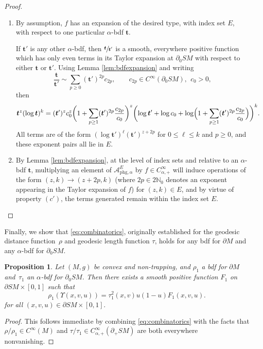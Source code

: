\documentclass[11pt]{article}
\newcommand{\skpt}{\smallskip}
\newenvironment{enumeratea}
{\bgroup\def\theenumi{\alph{enumi}}\begin{enumerate}}
{\end{enumerate}\egroup}
\theoremstyle{plain}
\newtheorem{Proposition}[Theorem]{Proposition}
\theoremstyle{definition}
\theoremstyle{remark}
\def\Nm{{\mathbb{N}}}
\def\A{\mathcal{A}}
\newcommand{\bt}{{\boldsymbol{t}}}
\newcommand{\del}{\partial}
\newcommand{\phg}{\mathrm{phg}}
\begin{document}
\skpt
\begin{proof}
\begin{enumeratea}
\item
By assumption, $f$ has an expansion of the desired type, with index set $E$, with respect to one particular $\alpha$-bdf $\bt$.

If $\bt'$ is any other $\alpha$-bdf, then $\sfrac{\bt}{\bt'}$ is a smooth, everywhere positive function which has only even terms in its Taylor expansion at $\del_0 SM$ with respect to either $\bt$ or $\bt'$. Using Lemma \ref{lem:bdfexpansion} and writing\vspace*{-3pt}\enlargethispage{.5\baselineskip}
\begin{equation*}
\frac{\bt}{\bt'} \sim \sum_{p\ge 0} (\bt')^{2p} c_{2p}, \qquad c_{2p}\in C^\infty(\partial_0 SM), \ \ c_0 > 0,
\end{equation*}
then\vspace*{-5pt}
\begin{equation*}
\bt^z (\log \bt)^k = (\bt')^z c^z_0 \biggl(1 + \sum_{p\ge 1} (\bt')^{2p} \frac{c_{2p}}{c_0} \biggr)^z \biggl(\log \bt' + \log c_0 + \log \Bigl(1 + \sum_{p\ge 1} (\bt')^{2p} \frac{c_{2p}}{c_0} \Bigr)\biggr)^k.
\end{equation*}
All terms are of the form $(\log \bt')^{\ell} (\bt')^{z+2p}$ for $0\le \ell \le k$ and $p\ge 0$, and these exponent pairs all lie in $E$.

\item
By Lemma \ref{lem:bdfexpansion}, at the level of index sets and relative to an $\alpha$-bdf $\bt$, multiplying an element of $\A_{\phg,\alpha}^E$ by $f\in C_{\alpha,+}^\infty$ will induce operations of the form $(z,k)\to (z+2p,k)$ (where $2p\in 2\Nm_0$ denotes an exponent appearing in the Taylor expansion of $f$) for $(z,k)\in E$, and by virtue of property $(c')$, the terms generated remain within the index set $E$.\qedhere
\end{enumeratea}
\end{proof}

Finally, we show that \eqref{eq:combinatorics}, originally established for the geodesic distance function~$\rho$
and geodesic length function $\tau$, holds for any bdf for $\del M$ and any $\alpha$-bdf for $\partial_0 SM$.

\begin{Proposition}\label{prop:combinatorics2}
Let $(M,g)$ be convex and non-trapping, and $\rho_1$ a bdf for $\partial M$ and~$\tau_1$ an $\alpha$-bdf for $\partial_0 SM$.
Then there exists a smooth positive function $F_1$ on $\del SM\times [0,1]$ such that
\begin{equation*}
\rho_1 (\Upsilon(x,v,u)) = \tau_1^2 (x,v) u(1-u) F_1(x,v,u).
\end{equation*}
for all $(x,v,u)\in \partial SM\times [0,1]$.
\end{Proposition}
\begin{proof}
This follows immediate by combining \eqref{eq:combinatorics} with the facts that $\rho/\rho_1 \in C^\infty(M)$
and $\tau/\tau_1\in C_{\alpha,+}^\infty(\partial_+ SM)$ are both everywhere nonvanishing.
\end{proof}
\end{document}
